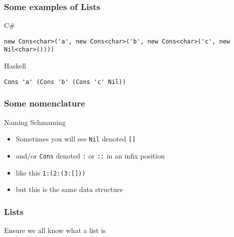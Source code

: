 \begin{frame}[fragile]
\frametitle{Some examples of Lists}
\begin{block}{C\#}
\begin{lstlisting}[style=csharp,basicstyle=\tiny\ttfamily,mathescape]
new Cons<char>('a', new Cons<char>('b', new Cons<char>('c', new Nil<char>())))
\end{lstlisting}
\end{block}
\begin{block}{Haskell}
\begin{lstlisting}[style=haskell,basicstyle=\scriptsize\ttfamily,mathescape]
Cons 'a' (Cons 'b' (Cons 'c' Nil))
\end{lstlisting}
\end{block}
\end{frame}

\begin{frame}
\frametitle{Some nomenclature}
\begin{block}{Naming Schmaming}
\begin{itemize}
\item<1-> Sometimes you will see \lstinline{Nil} denoted \lstinline{[]}
\item<2-> and/or \lstinline{Cons} denoted \lstinline{:} or \lstinline{::} in an infix position
\item<3-> like this \lstinline{1:(2:(3:[]))}
\item<4-> but this is the same data structure
\end{itemize}
\end{block}
\end{frame}

\begin{frame}
\frametitle{Lists}
\begin{center}
Ensure we all know what a list is
\end{center}
\end{frame}
